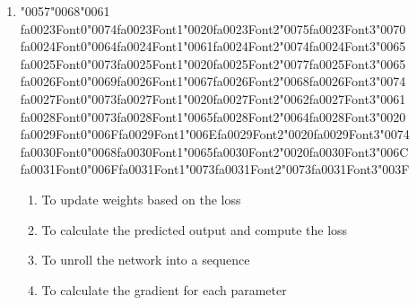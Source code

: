 \documentclass[12pt]{article}
\begin{document}
\begin{enumerate}[label=Q\arabic*.]
\item {\char"0057}{\char"0068}{\char"0061} {\csname fa0023Font0\endcsname\char"0074}{\csname fa0023Font1\endcsname\char"0020}{\csname fa0023Font2\endcsname\char"0075}{\csname fa0023Font3\endcsname\char"0070} {\csname fa0024Font0\endcsname\char"0064}{\csname fa0024Font1\endcsname\char"0061}{\csname fa0024Font2\endcsname\char"0074}{\csname fa0024Font3\endcsname\char"0065} {\csname fa0025Font0\endcsname\char"0073}{\csname fa0025Font1\endcsname\char"0020}{\csname fa0025Font2\endcsname\char"0077}{\csname fa0025Font3\endcsname\char"0065} {\csname fa0026Font0\endcsname\char"0069}{\csname fa0026Font1\endcsname\char"0067}{\csname fa0026Font2\endcsname\char"0068}{\csname fa0026Font3\endcsname\char"0074} {\csname fa0027Font0\endcsname\char"0073}{\csname fa0027Font1\endcsname\char"0020}{\csname fa0027Font2\endcsname\char"0062}{\csname fa0027Font3\endcsname\char"0061} {\csname fa0028Font0\endcsname\char"0073}{\csname fa0028Font1\endcsname\char"0065}{\csname fa0028Font2\endcsname\char"0064}{\csname fa0028Font3\endcsname\char"0020} {\csname fa0029Font0\endcsname\char"006F}{\csname fa0029Font1\endcsname\char"006E}{\csname fa0029Font2\endcsname\char"0020}{\csname fa0029Font3\endcsname\char"0074} {\csname fa0030Font0\endcsname\char"0068}{\csname fa0030Font1\endcsname\char"0065}{\csname fa0030Font2\endcsname\char"0020}{\csname fa0030Font3\endcsname\char"006C} {\csname fa0031Font0\endcsname\char"006F}{\csname fa0031Font1\endcsname\char"0073}{\csname fa0031Font2\endcsname\char"0073}{\csname fa0031Font3\endcsname\char"003F}
\begin{enumerate}[label=(\Alph*)]
    \item To update weights based on the loss
    \item To calculate the predicted output and compute the loss
    \item To unroll the network into a sequence
    \item To calculate the gradient for each parameter
\end{enumerate}

\end{enumerate}
\end{document}
